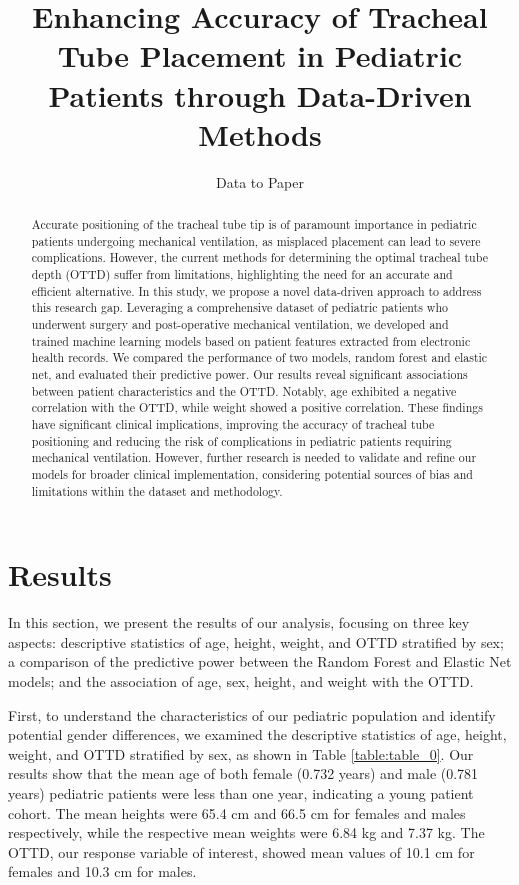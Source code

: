 \documentclass[11pt]{article}
\title{Enhancing Accuracy of Tracheal Tube Placement in Pediatric Patients through Data-Driven Methods}
\author{Data to Paper}
\begin{document}
\maketitle
\begin{abstract}
Accurate positioning of the tracheal tube tip is of paramount importance in pediatric patients undergoing mechanical ventilation, as misplaced placement can lead to severe complications. However, the current methods for determining the optimal tracheal tube depth (OTTD) suffer from limitations, highlighting the need for an accurate and efficient alternative. In this study, we propose a novel data-driven approach to address this research gap. Leveraging a comprehensive dataset of pediatric patients who underwent surgery and post-operative mechanical ventilation, we developed and trained machine learning models based on patient features extracted from electronic health records. We compared the performance of two models, random forest and elastic net, and evaluated their predictive power. Our results reveal significant associations between patient characteristics and the OTTD. Notably, age exhibited a negative correlation with the OTTD, while weight showed a positive correlation. These findings have significant clinical implications, improving the accuracy of tracheal tube positioning and reducing the risk of complications in pediatric patients requiring mechanical ventilation. However, further research is needed to validate and refine our models for broader clinical implementation, considering potential sources of bias and limitations within the dataset and methodology.
\end{abstract}
\section*{Results}
In this section, we present the results of our analysis, focusing on three key aspects: descriptive statistics of age, height, weight, and OTTD stratified by sex; a comparison of the predictive power between the Random Forest and Elastic Net models; and the association of age, sex, height, and weight with the OTTD.

First, to understand the characteristics of our pediatric population and identify potential gender differences, we examined the descriptive statistics of age, height, weight, and OTTD stratified by sex, as shown in Table {}\ref{table:table_0}. Our results show that the mean age of both female (0.732 years) and male (0.781 years) pediatric patients were less than one year, indicating a young patient cohort. The mean heights were 65.4 cm and 66.5 cm for females and males respectively, while the respective mean weights were 6.84 kg and 7.37 kg. The OTTD, our response variable of interest, showed mean values of 10.1 cm for females and 10.3 cm for males.
\end{document}

